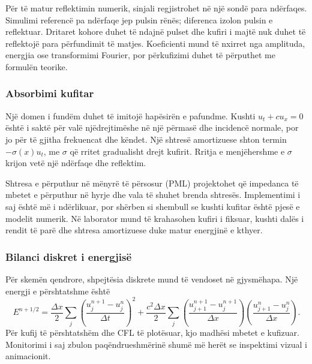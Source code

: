 \documentclass[11pt,oneside,openany]{book}
\begin{document}
Për të matur reflektimin numerik, sinjali regjistrohet në një sondë para ndërfaqes. Simulimi referencë pa ndërfaqe jep pulsin rënës; diferenca izolon pulsin e reflektuar. Dritaret kohore duhet të ndajnë pulset dhe kufiri i majtë nuk duhet të reflektojë para përfundimit të matjes. Koeficienti mund të nxirret nga amplituda, energjia ose transformimi Fourier, por përkufizimi duhet të përputhet me formulën teorike.

\subsubsection{Absorbimi kufitar}
Një domen i fundëm duhet të imitojë hapësirën e pafundme. Kushti $u_t+cu_x=0$ është i saktë për valë njëdrejtimëshe në një përmasë dhe incidencë normale, por jo për të gjitha frekuencat dhe këndet. Një shtresë amortizuese shton termin $-\sigma(x)u_t$, me $\sigma$ që rritet gradualisht drejt kufirit. Rritja e menjëhershme e $\sigma$ krijon vetë një ndërfaqe dhe reflektim.

Shtresa e përputhur në mënyrë të përsosur (PML) projektohet që impedanca të mbetet e përputhur në hyrje dhe vala të shuhet brenda shtresës. Implementimi i saj është më i ndërlikuar, por shërben si shembull se kushti kufitar është pjesë e modelit numerik. Në laborator mund të krahasohen kufiri i fiksuar, kushti dalës i rendit të parë dhe shtresa amortizuese duke matur energjinë e kthyer.

\subsubsection{Bilanci diskret i energjisë}
Për skemën qendrore, shpejtësia diskrete mund të vendoset në gjysmëhapa. Një energji e përshtatshme është
\begin{equation}
 E^{n+1/2}=\frac{\Delta x}{2}\sum_j
 \left(\frac{u_j^{n+1}-u_j^n}{\Delta t}\right)^2
 +\frac{c^2\Delta x}{2}\sum_j
 \left(\frac{u_{j+1}^{n+1}-u_j^{n+1}}{\Delta x}\right)
 \left(\frac{u_{j+1}^{n}-u_j^{n}}{\Delta x}\right).
\end{equation}
Për kufij të përshtatshëm dhe CFL të plotësuar, kjo madhësi mbetet e kufizuar. Monitorimi i saj zbulon paqëndrueshmërinë shumë më herët se inspektimi vizual i animacionit.





\end{document}
